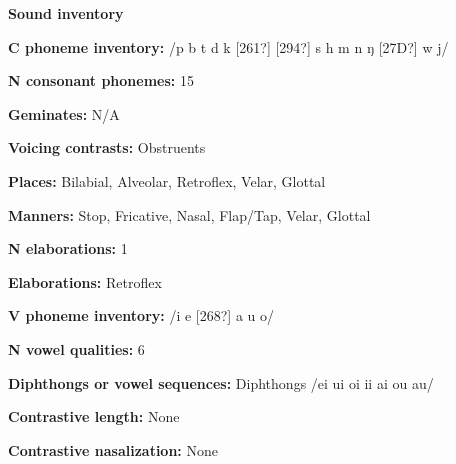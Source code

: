 \begin{styleBody}
\textbf{Sound inventory}
\end{styleBody}

\begin{styleBody}
\textbf{C phoneme inventory:} /p b t d k [261?] [294?] s h m n ŋ [27D?] w j/
\end{styleBody}

\begin{styleBody}
\textbf{N consonant phonemes:} 15
\end{styleBody}

\begin{styleBody}
\textbf{Geminates:} N/A
\end{styleBody}

\begin{styleBody}
\textbf{Voicing contrasts:} Obstruents
\end{styleBody}

\begin{styleBody}
\textbf{Places:} Bilabial, Alveolar, Retroflex, Velar, Glottal
\end{styleBody}

\begin{styleBody}
\textbf{Manners:} Stop, Fricative, Nasal, Flap/Tap, Velar, Glottal
\end{styleBody}

\begin{styleBody}
\textbf{N elaborations:} 1
\end{styleBody}

\begin{styleBody}
\textbf{Elaborations:} Retroflex
\end{styleBody}

\begin{styleBody}
\textbf{V phoneme inventory:} /i e [268?] a u o/
\end{styleBody}

\begin{styleBody}
\textbf{N vowel qualities:} 6
\end{styleBody}

\begin{styleBody}
\textbf{Diphthongs or vowel sequences:} Diphthongs /ei ui oi ii ai ou au/
\end{styleBody}

\begin{styleBody}
\textbf{Contrastive length:} None
\end{styleBody}

\begin{styleBody}
\textbf{Contrastive nasalization:} None
\end{styleBody}

